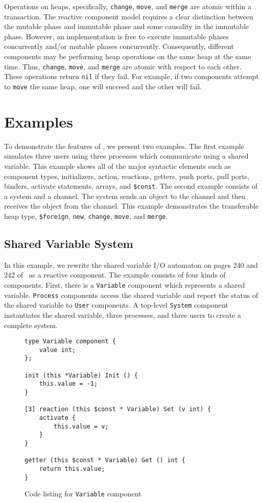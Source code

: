 Operations on heaps, specifically, \verb+change+, \verb+move+, and \verb+merge+ are atomic within a transaction.
The reactive component model requires a clear distinction between the mutable phase and immutable phase and some causality in the immutable phase.
However, an implementation is free to execute immutable phases concurrently and/or mutable phases concurrently.
Consequently, different components may be performing heap operations on the same heap at the same time.
Thus, \verb+change+, \verb+move+, and \verb+merge+ are atomic with respect to each other.
These operations return \verb+nil+ if they fail.
For example, if two components attempt to \verb+move+ the same heap, one will succeed and the other will fail.

\section{Examples}

To demonstrate the features of \rcgo{}, we present two examples.
The first example simulates three users using three processes which communicate using a shared variable.
This example shows all of the major syntactic elements such as component types, initializers, action, reactions, getters, push ports, pull ports, binders, activate statements, arrays, and \verb+$const+.
The second example consists of a system and a channel.
The system sends an object to the channel and then receives the object from the channel.
This example demonstrates the transferable heap type, \verb+$foreign+, \verb+new+, \verb+change+, \verb+move+, and \verb+merge+.

\subsection{Shared Variable System}

In this example, we rewrite the shared variable I/O automaton on pages 240 and 242 of~\cite{nancy1996distributed} as a reactive component.
The example consists of four kinds of components.
First, there is a \verb+Variable+ component which represents a shared variable.
\verb+Process+ components access the shared variable and report the status of the shared variable to \verb+User+ components.
A top-level \verb+System+ component instantiates the shared variable, three processes, and three users to create a complete system.

\begin{figure}
\begin{verbatim}
type Variable component {
    value int;
};

init (this *Variable) Init () {
    this.value = -1;
}

[3] reaction (this $const * Variable) Set (v int) {
    activate {
        this.value = v;
    }
}

getter (this $const * Variable) Get () int {
    return this.value;
}
\end{verbatim}
\cprotect\caption{Code listing for \verb+Variable+ component \label{variable}}
\end{figure}

